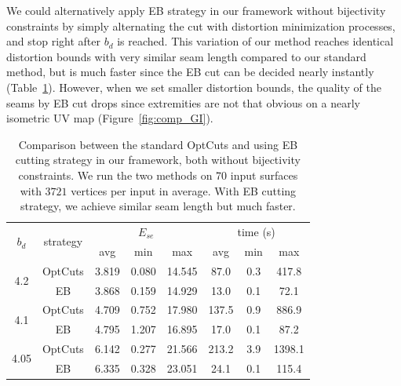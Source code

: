 We could alternatively apply EB strategy in our framework without bijectivity constraints by simply alternating the cut with distortion minimization processes, and stop right after $b_d$ is reached. This variation of our method reaches identical distortion bounds with very similar seam length compared to our standard method, but is much faster since the EB cut can be decided nearly instantly (Table~\ref{tb:comp_GI}). However, when we set smaller distortion bounds, the quality of the seams by EB cut drops since extremities are not that obvious on a nearly isometric UV map (Figure~\ref{fig:comp_GI}).

\begin{table}[!h]
\centering
\caption{Comparison between the standard OptCuts and using EB cutting strategy in our framework, both without bijectivity constraints. We run the two methods on 70 input surfaces with $3721$ vertices per input in average. With EB cutting strategy, we achieve similar seam length but much faster.} 
\label{tb:comp_GI}
\begin{tabular}{|c|c|ccc|ccc|}
\hline
\multirow{2}{*}{$b_d$} & \multirow{2}{*}{strategy} & \multicolumn{3}{c|}{$E_{se}$} & \multicolumn{3}{c|}{time (s)} \\ \cline{3-8} 
                       &                         & avg      & min     & max      & avg       & min    & max      \\ \hline
\multirow{2}{*}{4.2}   & OptCuts                    & 3.819   & 0.080  & 14.545  & 87.0   & 0.3 & 417.8 \\
                       & EB                & 3.868   & 0.159  & 14.929  & 13.0   & 0.1 & 72.1  \\ \hline
\multirow{2}{*}{4.1}   & OptCuts                    & 4.709   & 0.752  & 17.980  & 137.5  & 0.9 & 886.9 \\
                       & EB                & 4.795   & 1.207  & 16.895  & 17.0   & 0.1 & 87.2  \\ \hline
\multirow{2}{*}{4.05}  & OptCuts                    & 6.142   & 0.277  & 21.566  & 213.2  & 3.9 & 1398.1   \\
                       & EB                & 6.335   & 0.328  & 23.051  & 24.1   & 0.1 & 115.4 \\ \hline
\end{tabular}
\end{table}

